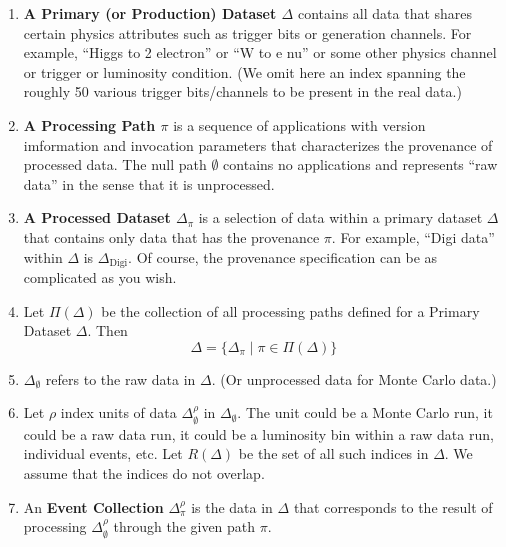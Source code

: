\documentclass{cmspaper}
\begin{document}
\begin{enumerate}

\item {\bf A Primary (or Production) Dataset $\Delta$} 
      contains all data that shares certain physics attributes such as
      trigger bits or generation channels.  For example, ``Higgs to
      2 electron'' or ``W to e nu'' or some other physics channel or
      trigger or luminosity condition.  (We omit here an index spanning
      the roughly 50 various trigger bits/channels to be present in the
      real data.)

\item {\bf A Processing Path $\pi$} is a sequence of applications
      with version imformation and invocation parameters that characterizes
      the provenance of processed data.  The null path $\emptyset$ contains
      no applications and represents ``raw data'' in the sense that it is
      unprocessed.

\item {\bf A Processed Dataset $\Delta_{\pi}$} is a selection of data within 
      a primary dataset $\Delta$ that contains only data that has the 
      provenance $\pi$.  For example, ``Digi data'' within $\Delta$ is 
      $\Delta_{\mbox{Digi}}$.  Of course, the provenance specification can 
      be as complicated as you wish.

\item Let $\Pi(\Delta)$ be the collection of all processing paths defined for a Primary 
Dataset $\Delta $.  Then 
\begin{equation}
    \Delta = \{ \Delta_{\pi} \mid \pi \in \Pi(\Delta) \}
\end{equation}

\item $\Delta_{\emptyset}$ refers to the raw data in $\Delta$. (Or unprocessed data for 
Monte Carlo data.) 

\item Let $\rho$ index units of data $\Delta_{\emptyset}^{\rho}$ 
      in $\Delta_{\emptyset}$.  The unit could be a Monte Carlo run,
      it could be a raw data run, it could be a luminosity bin within
      a raw data run, individual events, etc.  Let $R(\Delta)$ be the
      set of all such indices in $\Delta$.  We assume that the indices
      do not overlap.

\item An {\bf Event Collection} $\Delta_{\pi}^{\rho}$ is the data in 
      $\Delta$ that corresponds to the result of processing 
      $\Delta_{\emptyset}^{\rho}$ through the given path $\pi$.  


\end{enumerate}
\end{document}
